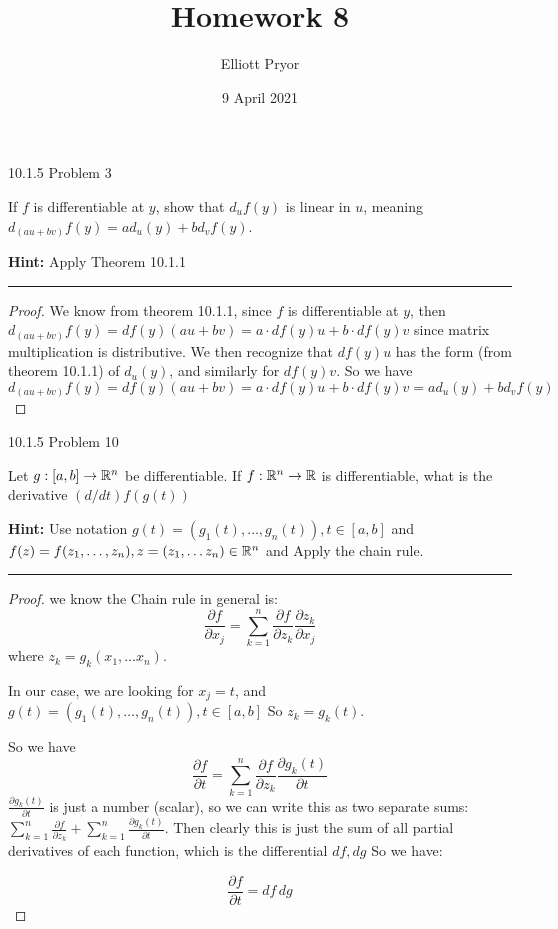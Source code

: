 \documentclass[11pt]{article}
\title{Homework 8}
\author{Elliott Pryor}
\date{9 April 2021}
\begin{document}
\maketitle

 10.1.5 Problem 3

If $f$ is differentiable at $y$, show that $d_uf(y)$ is linear in $u$,
meaning $d_{(au + bv)}f(y) = a d_u(y) + b d_v f(y)$.

\textbf{Hint:} Apply Theorem 10.1.1

\hrule


\begin{proof}
    
    We know from theorem 10.1.1, since $f$ is differentiable at $y$, then
    $d_{(au + bv)}f(y) = df(y) (au + bv) = a \cdot df(y) u + b \cdot df(y)  v$
    since matrix multiplication is distributive. 
    We then recognize that $df(y) u$ has the form (from theorem 10.1.1) of $d_u(y)$,
    and similarly for $df(y) v$. So we have 
    $d_{(au + bv)}f(y) = df(y) (au + bv) = a \cdot df(y) u + b \cdot df(y)  v = a d_u(y) + b d_v f(y)$
\end{proof}





 10.1.5 Problem 10

Let $g : [a,b] \to \mathbb{R}^n$ be differentiable. If $f : \mathbb{R}^n \to \mathbb{R}$ is differentiable,
what is the derivative $(d/dt)f(g(t))$

\textbf{Hint:} Use notation $g(t) = (g_1(t), \dots, g_n(t)), t \in [a,b]$
and $f(z) = f(z_1, \dots, z_n), z = (z_1, \dots z_n) \in \mathbb{R}^n$ and Apply
the chain rule.

\hrule


\begin{proof}
    
    we know the Chain rule in general is: 
    $$\frac{\partial f}{\partial x_j} = \sum_{k = 1} ^n \frac{\partial f}{\partial z_k} \frac{\partial z_k}{\partial x_j}$$
    where $z_k = g_k(x_1, \dots x_n)$.

    In our case, we are looking for $x_j = t$, and $g(t) = (g_1(t), \dots, g_n(t)), t \in [a,b]$
    So $z_k = g_k(t)$.

    So we have 
    $$\frac{\partial f}{\partial t} = \sum_{k = 1} ^n \frac{\partial f}{\partial z_k} \frac{\partial g_k(t)}{\partial t}$$
    $\frac{\partial g_k(t)}{\partial t}$ is just a number (scalar), so we can write this as two separate sums:
    $\sum_{k = 1} ^n \frac{\partial f}{\partial z_k} + \sum_{k = 1} ^n \frac{\partial g_k(t)}{\partial t}$.
    Then clearly this is just the sum of all partial derivatives of each function, which is the differential $df, dg$
    So we have:

    $$\frac{\partial f}{\partial t} = df \, dg$$

\end{proof}
\end{document}
